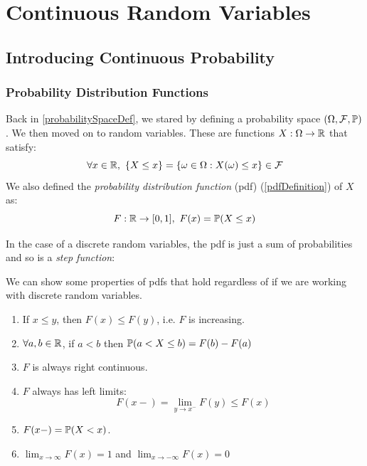 \documentclass[../main.tex]{subfiles}
\begin{document}
\chapter{Continuous Random Variables}
\section{Introducing Continuous Probability}
\subsection{Probability Distribution Functions}
\begin{remark}[Recap]
  Back in \cref{probabilitySpaceDef}, we stared by defining a probability space $(\Omega, \salg, \P)$.
  We then moved on to random variables.
  These are functions $X: \Omega \to \R$ that satisfy:
  \[
    \forall x \in \R,\ \{X \leq x\} = \{\omega \in \Omega: X(\omega) \leq x\} \in \salg
  \]
  We also defined the \textit{probability distribution function} (pdf) (\cref{pdfDefinition}) of $X$ as:
  \[
    F: \R \to [0, 1],\ F(x) = \P(X \leq x)
  \]
\end{remark}
In the case of a discrete random variables, the pdf is just a sum of probabilities and so is a \textit{step function}:
\begin{center}
\end{center}
We can show some properties of pdfs that hold regardless of if we are working with discrete random variables.
\begin{proposition}
  \label{pdfProperties}
  \begin{enumerate}
    \item If $x \leq y$, then $F(x) \leq F(y)$, i.e. $F$ is increasing.
    \item $\forall a, b \in \R$, if $a < b$ then $\P(a < X \leq b) = F(b) - F(a)$
    \item $F$ is always right continuous.
    \item $F$ always has left limits:
      \[
        F(x-) = \lim_{y \to x^{-}} F(y) \leq F(x)
      \]
    \item $F(x-) = \P(X < x)$.
    \item $\lim_{x \to \infty} F(x) = 1$ and $\lim_{x \to -\infty} F(x) = 0$
  \end{enumerate}
\end{proposition}
\end{document}
